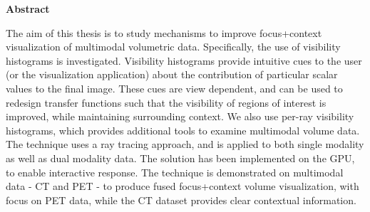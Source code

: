 
\begin{center}
\textbf{\large Abstract}
\end{center}

The aim of this thesis is to study mechanisms to improve focus+context visualization of multimodal volumetric data. Specifically, the use of visibility histograms is investigated. Visibility histograms provide intuitive cues to the user (or the visualization application) about the contribution of particular scalar values to the final image.  These cues are view dependent, and can be used to redesign transfer functions such that the visibility of regions of interest is improved, while maintaining surrounding context. We also use per-ray visibility histograms, which provides additional tools to examine multimodal volume data. ​The technique uses a ray tracing approach, and is applied to both single modality as well as dual modality data. The solution has been implemented on the GPU, to enable interactive response. The technique is demonstrated on multimodal data -  CT and PET - to produce fused focus+context volume visualization, with focus on PET data, while the CT dataset provides clear contextual information. 

\vspace{1cm}


